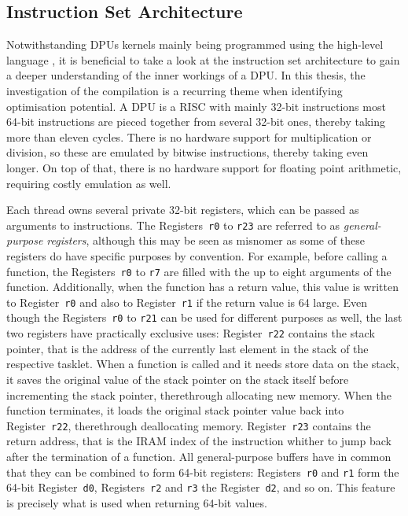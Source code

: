 \subsection{Instruction Set Architecture}
\label{sec:prereq:arch:isa}

Notwithstanding \acp{DPU} kernels mainly being programmed using the high-level language \langC{}, it is beneficial to take a look at the instruction set architecture to gain a deeper understanding of the inner workings of a \ac{DPU}.
In this thesis, the investigation of the compilation is a recurring theme when identifying optimisation potential.
A \ac{DPU} is a \ac{RISC} with mainly 32-bit instructions \Dash most 64-bit instructions are pieced together from several 32-bit ones, thereby taking more than eleven cycles.
There is no hardware support for multiplication or division, so these are emulated by bitwise instructions, thereby taking even longer.
On top of that, there is no hardware support for floating point arithmetic, requiring costly emulation as well.

Each thread owns several private 32-bit registers, which can be passed as arguments to instructions.
The Registers~\lstinline|r0| to \lstinline|r23| are referred to as \emph{general-purpose registers}, although this may be seen as misnomer as some of these registers do have specific purposes by convention.
For example, before calling a \langC{} function, the Registers~\lstinline|r0| to \lstinline|r7| are filled with the up to eight arguments of the function.
Additionally, when the function has a return value, this value is written to Register~\lstinline|r0| and also to Register~\lstinline|r1| if the return value is \qty{64}{\bit} large.
Even though the Registers~\lstinline|r0| to \lstinline|r21| can be used for different purposes as well, the last two registers have practically exclusive uses:
Register~\lstinline|r22| contains the stack pointer, that is the address of the currently last element in the stack of the respective tasklet.
When a function is called and it needs store data on the stack, it saves the original value of the stack pointer on the stack itself before incrementing the stack pointer, therethrough allocating new memory.
When the function terminates, it loads the original stack pointer value back into Register~\lstinline|r22|, therethrough deallocating memory.
Register~\lstinline|r23| contains the return address, that is the \ac{IRAM} index of the instruction whither to jump back after the termination of a function.
All general-purpose buffers have in common that they can be combined to form 64-bit registers:
Registers~\lstinline|r0| and \lstinline|r1| form the 64-bit Register~\lstinline|d0|, Registers~\lstinline|r2| and \lstinline|r3| the Register~\lstinline|d2|, and so on.
This feature is precisely what is used when returning 64-bit values.

